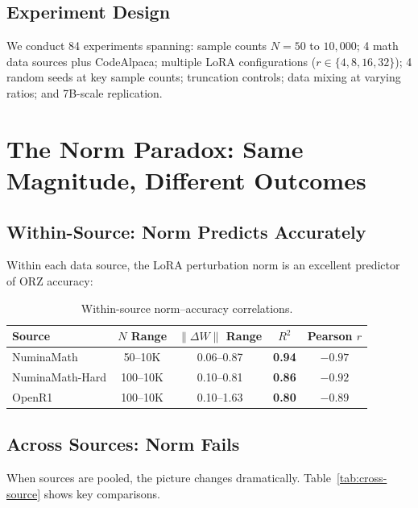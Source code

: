 \documentclass{article}
\begin{document}
\subsection{Experiment Design}

We conduct 84 experiments spanning: sample counts $N = 50$ to $10{,}000$; 4 math data sources plus CodeAlpaca; multiple LoRA configurations ($r \in \{4, 8, 16, 32\}$); 4 random seeds at key sample counts; truncation controls; data mixing at varying ratios; and 7B-scale replication.

\section{The Norm Paradox: Same Magnitude, Different Outcomes}
\label{sec:norm-paradox}

\subsection{Within-Source: Norm Predicts Accurately}

Within each data source, the LoRA perturbation norm is an excellent predictor of ORZ accuracy:

\begin{table}[h]
\centering
\caption{Within-source norm--accuracy correlations.}
\label{tab:within-source}
\small
\begin{tabular}{@{}lcccc@{}}
\toprule
Source & $N$ Range & $\|\Delta W\|$ Range & $R^2$ & Pearson $r$ \\
\midrule
NuminaMath & 50--10K & 0.06--0.87 & \textbf{0.94} & $-0.97$ \\
NuminaMath-Hard & 100--10K & 0.10--0.81 & \textbf{0.86} & $-0.92$ \\
OpenR1 & 100--10K & 0.10--1.63 & \textbf{0.80} & $-0.89$ \\
\bottomrule
\end{tabular}
\end{table}

\subsection{Across Sources: Norm Fails}

When sources are pooled, the picture changes dramatically. Table~\ref{tab:cross-source} shows key comparisons.
\end{document}

